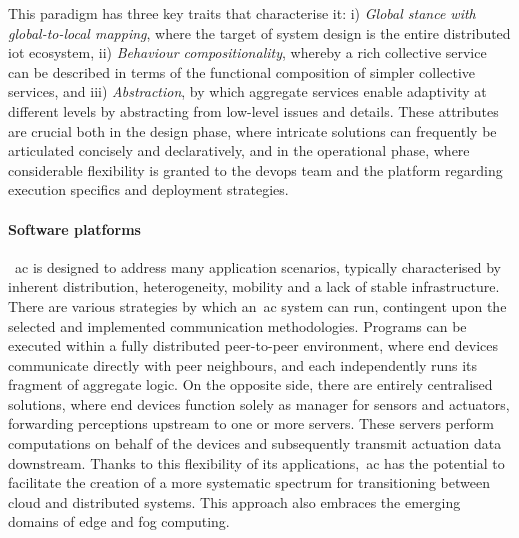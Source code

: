 This paradigm has three key traits that characterise it:
    i) \emph{Global stance with global-to-local mapping}, where the target of system design is the entire distributed
        \ac{iot} ecosystem,
    ii) \emph{Behaviour compositionality}, whereby a rich collective service can be described in terms of the functional
        composition of simpler collective services, and
    iii) \emph{Abstraction}, by which aggregate services enable adaptivity at different levels by abstracting from low-level
        issues and details.
These attributes are crucial both in the design phase, where intricate solutions can frequently be articulated concisely
and declaratively, and in the operational phase, where considerable flexibility is granted to the devops team and the
platform regarding execution specifics and deployment strategies.

\paragraph{Software platforms}
~\ac{ac} is designed to address many application scenarios, typically characterised by inherent distribution, heterogeneity,
mobility and a lack of stable infrastructure.
There are various strategies by which an~\ac{ac} system can run, contingent upon the selected and implemented
communication methodologies.
Programs can be executed within a fully distributed peer-to-peer environment, where end devices communicate directly
with peer neighbours, and each independently runs its fragment of aggregate logic.
On the opposite side, there are entirely centralised solutions, where end devices function solely as manager for sensors
and actuators, forwarding perceptions upstream to one or more servers.
These servers perform computations on behalf of the devices and subsequently transmit actuation data downstream.
Thanks to this flexibility of its applications,~\ac{ac} has the potential to facilitate the creation of a more systematic
spectrum for transitioning between cloud and distributed systems.
This approach also embraces the emerging domains of edge and fog computing.

